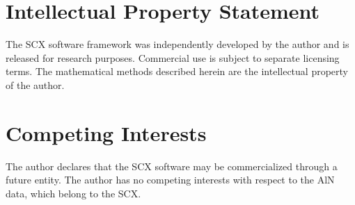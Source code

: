\documentclass[twoside,prb,aps,floatfix,superscriptaddress,longbibliography]{revtex4-2}
\begin{document}
\section*{Intellectual Property Statement}
The SCX software framework was independently developed by the author and is released  for research purposes. Commercial use is subject to separate licensing terms. The mathematical methods described herein are the intellectual property of the author.

\section*{Competing Interests}
The author declares that the SCX software may be commercialized through a future entity. The author has no competing interests with respect to the AlN data, which belong to the SCX.
\end{document}
